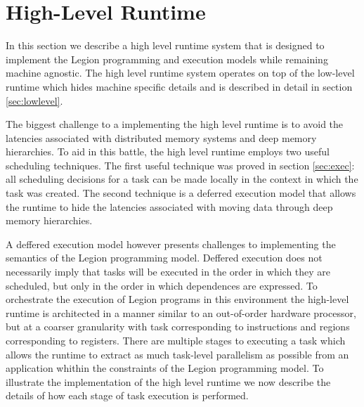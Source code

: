 
\section{High-Level Runtime} 
\label{sec:highlevel}
In this section we describe a high level runtime system
that is designed to implement the Legion programming
and execution models while remaining machine agnostic.  
The high level runtime system operates on top of the 
low-level runtime which hides machine specific details
and is described in detail in section \ref{sec:lowlevel}.

The biggest challenge to a implementing the high level
runtime is to avoid the latencies associated with distributed
memory systems and deep memory hierarchies.  To aid
in this battle, the high level runtime employs two useful 
scheduling techniques.  The first useful technique was proved
in section \ref{sec:exec}: all scheduling decisions for a
task can be made locally in the context in which the
task was created.  The second technique is a deferred execution
model that allows the runtime to hide the latencies associated
with moving data through deep memory hierarchies.


A deffered execution model however presents challenges to implementing
the semantics of the Legion programming model.  Deffered execution
does not necessarily imply that tasks will be executed in the order in
which they are scheduled, but only in the order in which dependences
are expressed.  To orchestrate the execution of Legion
programs in this environment the high-level runtime is architected
in a manner similar to an out-of-order hardware processor, but at
a coarser granularity with task corresponding to instructions and
regions corresponding to registers.  There are multiple stages to 
executing a task which allows the runtime to extract
as much task-level parallelism as possible from an application whithin
the constraints of the Legion programming model.  To illustrate
the implementation of the high level runtime we now describe the
details of how each stage of task execution is performed.

